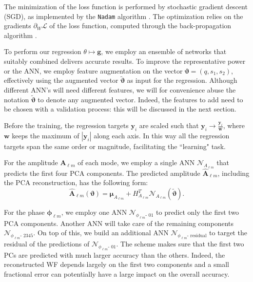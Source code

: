 \documentclass[twocolumn,showpacs,preprintnumbers,nofootinbib,prd,
superscriptaddress,10pt]{revtex4-1}
\begin{document}
The minimization of the loss function is performed by stochastic gradient descent (SGD), as implemented by the \texttt{Nadam} algorithm \cite{Kingma2014AdamAM, dozat.2016}. The optimization relies on the gradients $\partial_W \mathcal{L}$ of the loss function, computed through the 
back-propagation algorithm \cite{backprop}.

To perform our regression $\theta \longmapsto \boldsymbol{g}$, we employ an ensemble of networks that suitably combined delivers accurate results.
To improve the representative power or the ANN, we employ feature augmentation on the vector $\boldsymbol{\vartheta} = (q, s_1, s_2)$, effectively using the augmented vector $\tilde{\boldsymbol{\vartheta}}$ as input for the regression. Although different ANN's will need different features, we will for convenience 
abuse the notation $\tilde{\boldsymbol{\vartheta}}$ to denote any augmented vector. Indeed, the features to add need to be chosen with a validation process: this will be discussed in the next section.

Before the training, the regression targets $\boldsymbol{y}_i$ are scaled such that $\boldsymbol{y}_i \rightarrow \frac{\boldsymbol{y}_i}{\boldsymbol{w}}$, where $\boldsymbol{w}$ keeps the maximum of $|\boldsymbol{y}_i|$ along each axis. %
In this way all the regression targets span the same order or magnitude, facilitating the ``learning" task.

For the amplitude $\boldsymbol{A}_{\ell m}$ of each mode, we employ a single ANN $\mathcal{N}_{A_{\ell m}}$ that predicts the first four PCA components.
The predicted amplitude $\hat{\boldsymbol{A}}_{\ell m}$, including the PCA reconstruction, has the following form:
\begin{equation}\label{eq:amp_pred}
	\hat{\boldsymbol{A}}_{\ell m}(\boldsymbol{\vartheta}) = \boldsymbol{\mu}_{A_{\ell m}} + H_{A_{\ell m}}^T \mathcal{N}_{A_{\ell m}}(\tilde{\boldsymbol{\vartheta}}).
\end{equation}

For the phase $\boldsymbol{\phi}_{\ell m}$, we employ one ANN $\mathcal{N}_{\phi_{\ell m}\text{- 01}}$ to predict only the first two PCA components.
Another ANN will take care of the remaining components $\mathcal{N}_{\phi_{\ell m}\text{- 2345}}$.
On top of this, we build an additional ANN $\mathcal{N}_{\phi_{\ell m}\text{- residual}}$ to target the residual of the predictions of $\mathcal{N}_{\phi_{\ell m}\text{- 01}}$.
The scheme makes sure that the first two PCs are predicted with much larger accuracy than the others. Indeed, the reconstructed WF depends largely on the first two components and a small fractional error can potentially have a large impact on the overall accuracy.
\end{document}
